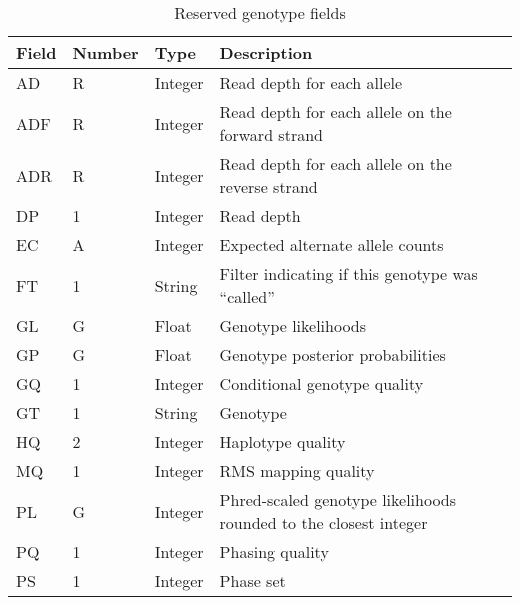 \documentclass[8pt]{article}
\begin{document}
\begin{table}[htbp]
  \centering
    \begin{tabularx}{\textwidth}{ | p{2.5cm} | p{1.5cm} | p{1.5cm} | X | }
      Field		& Number	& Type		& Description \\ \hline
      AD		& R		& Integer	& Read depth for each allele \\
      ADF		& R		& Integer	& Read depth for each allele on the forward strand \\
      ADR		& R		& Integer	& Read depth for each allele on the reverse strand \\
      DP		& 1		& Integer	& Read depth \\
      EC		& A		& Integer	& Expected alternate allele counts \\
      FT		& 1		& String	& Filter indicating if this genotype was ``called'' \\
      GL		& G		& Float		& Genotype likelihoods \\
      GP		& G		& Float		& Genotype posterior probabilities \\
      GQ		& 1		& Integer	& Conditional genotype quality \\
      GT		& 1		& String	& Genotype \\
      HQ		& 2		& Integer	& Haplotype quality \\
      MQ		& 1		& Integer	& RMS mapping quality \\
      PL		& G		& Integer	& Phred-scaled genotype likelihoods rounded to the closest integer \\
      PQ		& 1		& Integer	& Phasing quality \\
      PS		& 1		& Integer	& Phase set \\
  \end{tabularx}
  \caption{Reserved genotype fields}
  \label{table:reserved-genotypes}
\end{table}
\end{document}

